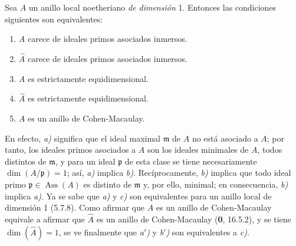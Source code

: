 \begin{example}[7.2.1.1]
\label{IV.2.s7.2.1.1-fr}
Sea $A$ un anillo local noetheriano \emph{de dimensión} 1. Entonces
las condiciones siguientes son equivalentes:
\begin{enumerate}
\item[\emph{a)}] $A$ carece de ideales primos asociados inmersos.
\item[\emph{a$'$)}] $\widehat A$ carece de ideales primos asociados inmersos.
\item[\emph{b)}] $A$ es estrictamente equidimensional.
\item[\emph{b$'$)}] $\widehat A$ es estrictamente equidimensional.
\item[\emph{c)}] $A$ es un anillo de Cohen-Macaulay.
\end{enumerate}
\end{example}

En efecto, \emph{a)} significa que el ideal maximal $\mathfrak m$ de $A$ no
está asociado a $A$; por tanto, los ideales primos asociados a $A$ son
los ideales minimales de $A$, todos distintos de $\mathfrak m$, y
para un ideal $\mathfrak p$ de esta clase se tiene necesariamente
$\dim(A/\mathfrak p)=1$; así, \emph{a)} implica \emph{b)}. Recíprocamente, \emph{b)}
implica que todo ideal primo $\mathfrak p\in\operatorname{Ass}(A)$ es
distinto de $\mathfrak m$ y, por ello, minimal; en consecuencia, \emph{b)}
implica \emph{a)}. Ya se sabe que \emph{a)} y \emph{c)} son equivalentes para un anillo local
de dimensión 1 (5.7.8). Como afirmar que $A$ es un anillo de
Cohen-Macaulay equivale a afirmar que $\widehat A$ es un anillo de Cohen-Macaulay
(\textbf{0}, 16.5.2), y se tiene $\dim(\widehat A)=1$, se ve finalmente que
\emph{a$'$)} y \emph{b$'$)} son equivalentes a \emph{c)}.
